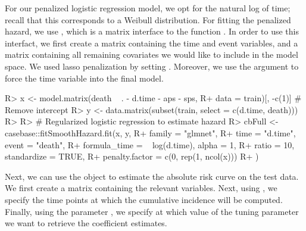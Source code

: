 \documentclass[
]{jss}
\begin{document}
For our penalized logistic regression model, we opt for the natural log
of time; recall that this corresponds to a Weibull distribution. For
fitting the penalized hazard, we use , which
is a matrix interface to the function . In order
to use this interfact, we first create a matrix  containing the
time and event variables, and a matrix  containing all remaining
covariates we would like to include in the model space. We used lasso
penalization by setting . Moreover, we use the argument
 to force the time variable into the final model.

\begin{CodeChunk}

\begin{CodeInput}
R> x <- model.matrix(death ~ . - d.time - aps - sps, 
R+                   data = train)[, -c(1)] # Remove intercept
R> y <- data.matrix(subset(train, select = c(d.time, death)))
R> 
R> # Regularized logistic regression to estimate hazard
R> cbFull <- casebase::fitSmoothHazard.fit(x, y,
R+   family = "glmnet",
R+   time = "d.time", event = "death",
R+   formula_time = ~ log(d.time), alpha = 1,
R+   ratio = 10, standardize = TRUE,
R+   penalty.factor = c(0, rep(1, ncol(x)))
R+ )
\end{CodeInput}
\end{CodeChunk}

Next, we can use the object  to estimate the absolute risk
curve on the test data. We first create a matrix  containing
the relevant variables. Next, using , we specify the time
points at which the cumulative incidence will be computed. Finally,
using the parameter , we specify at which value
of the tuning parameter we want to retrieve the coefficient estimates.

\begin{CodeChunk}

\end{CodeChunk}
\end{document}
